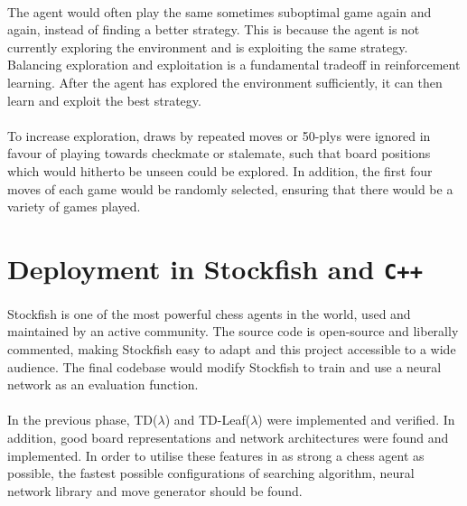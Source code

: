 \documentclass[12pt,a4paper]{book}
\begin{document}
\paragraph{} The agent would often play the same sometimes suboptimal game again and again, instead of finding a better strategy. This is because the agent is not currently exploring the environment and is exploiting the same strategy. Balancing exploration and exploitation is a fundamental tradeoff in reinforcement learning. After the agent has explored the environment sufficiently, it can then learn and exploit the best strategy.

\paragraph{} To increase exploration, draws by repeated moves or 50-plys were ignored in favour of playing towards checkmate or stalemate, such that board positions which would hitherto be unseen could be explored. In addition, the first four moves of each game would be randomly selected, ensuring that there would be a variety of games played.

\section{Deployment in Stockfish and \texttt{C++}}

\paragraph{} Stockfish is one of the most powerful chess agents in the world, used and maintained by an active community. The source code is open-source and liberally commented, making Stockfish easy to adapt and this project accessible to a wide audience. The final codebase would modify Stockfish to train and use a neural network as an evaluation function.

\paragraph{} In the previous phase, TD($\lambda$) and TD-Leaf($\lambda$) were implemented and verified. In addition, good board representations and network architectures were found and implemented. In order to utilise these features in as strong a chess agent as possible, the fastest possible configurations of searching algorithm, neural network library and move generator should be found.
\end{document}
